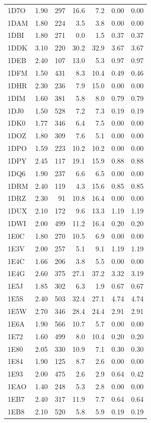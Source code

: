 \begin{longtable}{lrrrrrr}
1D7O & 1.90 & 297 & 16.6 & 7.2 & 0.00 & 0.00 \\
1DAM & 1.80 & 224 & 3.5 & 3.8 & 0.00 & 0.00 \\
1DBI & 1.80 & 271 & 0.0 & 1.5 & 0.37 & 0.37 \\
1DDK & 3.10 & 220 & 30.2 & 32.9 & 3.67 & 3.67 \\
1DEB & 2.40 & 107 & 13.0 & 5.3 & 0.97 & 0.97 \\
1DFM & 1.50 & 431 & 8.3 & 10.4 & 0.49 & 0.46 \\
1DHR & 2.30 & 236 & 7.9 & 15.0 & 0.00 & 0.00 \\
1DIM & 1.60 & 381 & 5.8 & 8.0 & 0.79 & 0.79 \\
1DJ0 & 1.50 & 528 & 7.2 & 7.3 & 0.19 & 0.19 \\
1DK0 & 1.77 & 346 & 6.4 & 7.5 & 0.00 & 0.00 \\
1DOZ & 1.80 & 309 & 7.6 & 5.1 & 0.00 & 0.00 \\
1DPO & 1.59 & 223 & 10.2 & 10.2 & 0.00 & 0.00 \\
1DPY & 2.45 & 117 & 19.1 & 15.9 & 0.88 & 0.88 \\
1DQ6 & 1.90 & 237 & 6.6 & 6.5 & 0.00 & 0.00 \\
1DRM & 2.40 & 119 & 4.3 & 15.6 & 0.85 & 0.85 \\
1DRZ & 2.30 & 91 & 10.8 & 16.4 & 0.00 & 0.00 \\
1DUX & 2.10 & 172 & 9.6 & 13.3 & 1.19 & 1.19 \\
1DWI & 2.00 & 499 & 11.2 & 16.4 & 0.20 & 0.20 \\
1E0C & 1.80 & 270 & 10.5 & 6.9 & 0.00 & 0.00 \\
1E3V & 2.00 & 257 & 5.1 & 9.1 & 1.19 & 1.19 \\
1E4C & 1.66 & 206 & 3.8 & 5.5 & 0.00 & 0.00 \\
1E4G & 2.60 & 375 & 27.1 & 37.2 & 3.32 & 3.19 \\
1E5J & 1.85 & 302 & 6.3 & 1.9 & 0.67 & 0.67 \\
1E5S & 2.40 & 503 & 32.4 & 27.1 & 4.74 & 4.74 \\
1E5W & 2.70 & 346 & 28.4 & 24.4 & 2.91 & 2.91 \\
1E6A & 1.90 & 566 & 10.7 & 5.7 & 0.00 & 0.00 \\
1E72 & 1.60 & 499 & 8.0 & 10.4 & 0.20 & 0.20 \\
1E80 & 2.05 & 330 & 10.9 & 7.1 & 0.30 & 0.30 \\
1E84 & 1.90 & 125 & 8.7 & 2.6 & 0.00 & 0.00 \\
1E93 & 2.00 & 475 & 2.6 & 2.9 & 0.64 & 0.42 \\
1EAO & 1.40 & 248 & 5.3 & 2.8 & 0.00 & 0.00 \\
1EB7 & 2.40 & 317 & 11.9 & 7.7 & 0.64 & 0.64 \\
1EB8 & 2.10 & 520 & 5.8 & 5.9 & 0.19 & 0.19 \\
\end{longtable}
